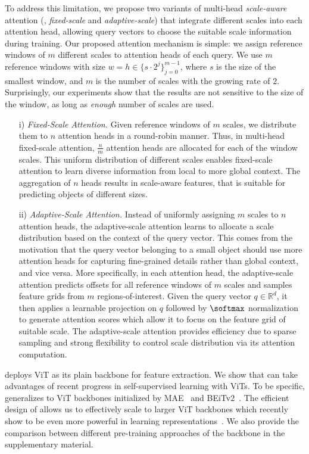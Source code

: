 To address this limitation, we propose two variants of multi-head \emph{scale-aware} attention (\ie, \emph{fixed-scale} and \emph{adaptive-scale}) that integrate different scales into each attention head, allowing query vectors to choose the suitable scale information during training. Our proposed attention mechanism is simple: we assign reference windows of $m$ different scales to attention heads of each query. We use $m$ reference windows with size $w {=} h \in \{s \cdot 2^j\}_{j=0}^{m-1}$, where $s$ is the size of the smallest window, and $m$ is the number of scales with the growing rate of $2$. Surprisingly, our experiments show that the results are not sensitive to the size of the window, as long as \emph{enough} number of scales are used.
%
\begin{enumerate}[leftmargin=*,itemsep=0pt,topsep=0pt]
    \item[i)] \emph{Fixed-Scale Attention.} Given reference windows of $m$ scales, we distribute them to $n$ attention heads in a round-robin manner. Thus, in multi-head fixed-scale attention, $\frac{n}{m}$ attention heads are allocated for each of the window scales. This uniform distribution of different scales enables fixed-scale attention to learn diverse information from local to more global context. The aggregation of $n$ heads results in scale-aware features, that is suitable for predicting objects of different sizes.
    \item[ii)] \emph{Adaptive-Scale Attention.} Instead of uniformly assigning $m$ scales to $n$ attention heads, the adaptive-scale attention learns to allocate a scale distribution based on the context of the query vector. This comes from the motivation that the query vector belonging to a small object should use more attention heads for capturing fine-grained details rather than global context, and vice versa. More specifically, in each attention head, the adaptive-scale attention predicts offsets for all reference windows of $m$ scales and samples feature grids from $m$ regions-of-interest. Given the query vector $q \in \mathbb{R}^d$, it then applies a learnable projection on $q$ followed by $\softmax$ normalization to generate attention scores which allow it to focus on the feature grid of suitable scale. The adaptive-scale attention provides efficiency due to sparse sampling and strong flexibility to control scale distribution via its attention computation.
\end{enumerate}

 \ours deploys ViT as its plain backbone for feature extraction. We show that \ours can take advantages of recent progress in self-supervised learning with ViTs. To be specific, \ours generalizes to ViT backbones initialized by MAE~\cite{he2022mae} and BEiTv2~\cite{peng2022beitv2}. The efficient design of \ours allows us to effectively scale to larger ViT backbones which recently show to be even more powerful in learning representations~\cite{he2022mae,zhai2022scalingvit,dehghani2023scalingvit22b}. We also provide the comparison between different pre-training approaches of the \ours backbone in the supplementary material.


